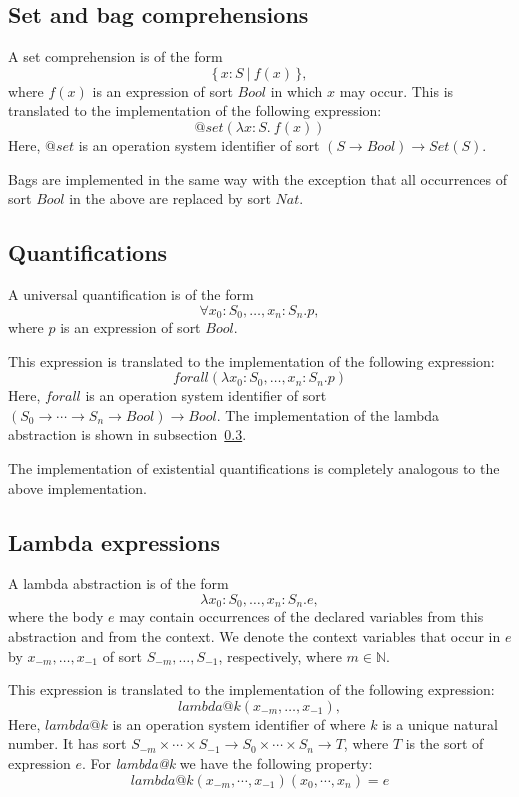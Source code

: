 \documentclass[a4paper,fleqn]{article}
\newcommand{\frm}[1]{\mbox{\ensuremath{#1}}}
\newcommand{\f}[1]{\ensuremath{\mathit{#1}}}
\newcommand{\fa}[2]{\ensuremath{\f{#1}(#2)}}
\newcommand{\set}[1]{\ensuremath{\{\,#1\,\}}}
\newcommand{\scompr}[2]{\ensuremath{\set{#1\ |\ #2}}}
\newcommand{\nat}{\ensuremath{\mathbb{N}}}
\newcommand{\srtbool}{\f{Bool}}
\newcommand{\srtnat}{\f{Nat}}
\begin{document}
\subsection{Set and bag comprehensions}

A set comprehension is of the form
\[\scompr{x{:}S}{\fa{f}{x}},\]
where \frm{\fa{f}{x}} is an expression of sort \frm{\srtbool} in which \frm{x}
may occur. This is translated to the implementation of the following
expression:
\[\fa{@set}{\lambda x{:}S.\ \fa{f}{x}}\]
Here, \frm{\f{@set}} is an operation system identifier of sort \frm{(S \to
\srtbool) \to \fa{Set}{S}}.

Bags are implemented in the same way with the exception that all occurrences of
sort \frm{\srtbool} in the above are replaced by sort \frm{\srtnat}.

\subsection{Quantifications}

A universal quantification is of the form
\[\forall x_{0}{:}S_{0}, \ldots, x_{n}{:}S_{n}. p,\]
where \frm{p} is an expression of sort \frm{\srtbool}.

This expression is translated to the implementation of the following
expression:
\[\fa{forall}{\lambda x_{0}{:}S_{0}, \ldots, x_{n}{:}S_{n}. p}\]
Here, \frm{\f{forall}} is an operation system identifier of sort
\frm{(S_{0} \to \cdots \to S_{n} \to \srtbool) \to \srtbool}. The
implementation of the lambda abstraction is shown in
subsection~\ref{subsec:lambda}.

The implementation of existential quantifications is completely analogous to
the above implementation.

\subsection{Lambda expressions}
\label{subsec:lambda}

A lambda abstraction is of the form
\[\lambda x_{0}{:}S_{0}, \ldots, x_{n}{:}S_{n}. e,\]
where the body \frm{e} may contain occurrences of the declared variables from
this abstraction and from the context. We denote the context variables that
occur in \frm{e} by \frm{x_{-m}, \ldots, x_{-1}} of sort \frm{S_{-m}, \ldots,
S_{-1}}, respectively, where \frm{m \in \nat}.

This expression is translated to the implementation of the following
expression:
\[\fa{lambda@k}{x_{-m}, \ldots, x_{-1}},\]
Here, \frm{\f{lambda@k}} is an operation system identifier of where \frm{k} is
a unique natural number. It has sort \frm{S_{-m} \times \cdots \times S_{-1}
\to S_{0} \times \cdots \times S_{n} \to T}, where \frm{T} is the sort of expression
\frm{e}. For \emph{lambda@k} we have the following property:
\[\mathit{lambda@k}(x_{-m},\cdots,x_{-1})(x_{0},\cdots,x_{n}) = e\]
\end{document}
